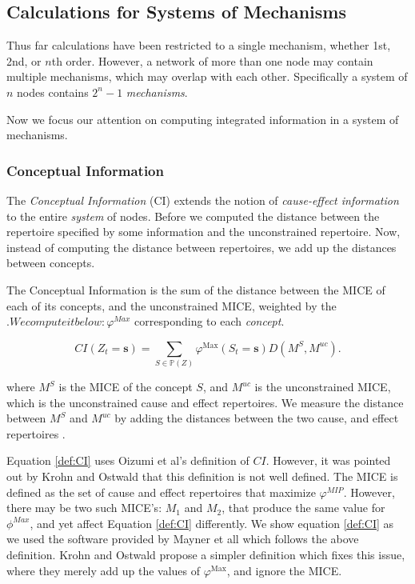 \subsection{Calculations for Systems of Mechanisms}
\label{sec:systems}
Thus far calculations have been restricted to a single mechanism, whether 1st, 2nd, or $n$th order. However, a network of more than one node may contain multiple mechanisms, which may overlap with each other. Specifically a system of $n$ nodes contains $2^n-1$ \textit{mechanisms}.

Now we focus our attention on computing integrated information in a system of mechanisms. 

\subsubsection{Conceptual Information}
\label{sec:CI}
The \textit{Conceptual Information} (CI)\cite{oizumi2014phenomenology}  extends the notion of \textit{cause-effect information} to the entire \textit{system} of nodes. Before we computed the distance between the repertoire specified by some information and the unconstrained repertoire. Now, instead of computing the distance between repertoires, we add up the distances between concepts.

The Conceptual Information is the sum of the distance between the MICE of each of its concepts, and the unconstrained MICE, weighted by the $. We compute it below:
\varphi^{\textit{Max}}$ corresponding to each \textit{concept}.

\begin{equation}
\label{def:CI}
CI(Z_t = \mathbf{s}) = \sum \limits_{S \in \mathbb{P}(Z)} \varphi^{\text{Max}}(S_t=\mathbf{s}) D(M^S, M^{uc}).
\end{equation}

where $M^S$ is the MICE of the concept $S$, and $M^{uc}$ is the unconstrained MICE, which is the unconstrained cause and effect repertoires. We measure the distance between $M^S$ and $M^{uc}$ by adding the distances between the two cause, and effect repertoires \cite{oizumi2014phenomenology}.

\begin{remark}
	Equation \ref{def:CI} uses Oizumi et al's \cite{oizumi2014phenomenology} definition of $CI$. However, it was pointed out by Krohn and Ostwald \cite{krohn2016computing} that this definition is not well defined. The MICE is defined as the set of cause and effect repertoires that maximize $\varphi^{MIP}$. However, there may be two such MICE's: $M_1$ and $M_2$, that produce the same value for $\phi^{Max}$, and yet affect Equation \ref{def:CI} differently. We show equation \ref{def:CI} as we used the software provided by Mayner et all \cite{pyphi} which follows the above definition. Krohn and Ostwald propose a simpler definition which fixes this issue, where they merely add up the values of $\varphi^{\text{Max}}$, and ignore the MICE.
\end{remark}

